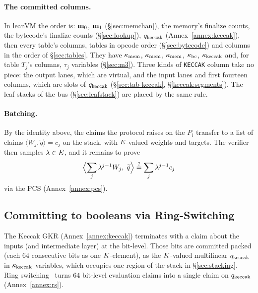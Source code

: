\paragraph{The committed columns.} In leanVM the order is: $\mathbf{m}_0$, $\mathbf{m}_1$ (\S\ref{sec:memchan}), the memory's finalize counts, the bytecode's finalize counts (\S\ref{sec:lookup}), $q_{\mathrm{keccak}}$ (Annex~\ref{annex:keccak}), then every table's columns, tables in opcode order (\S\ref{sec:bytecode}) and columns in the order of \S\ref{sec:tables}. They have $\kappa_{\mathrm{mem}}$, $\kappa_{\mathrm{mem}}$, $\kappa_{\mathrm{mem}}$, $\kappa_{\mathrm{bc}}$, $\kappa_{\mathrm{keccak}}$ and, for table $T_j$'s columns, $\tau_j$ variables (\S\ref{sec:m3}). Three kinds of \texttt{KECCAK} column take no piece: the output lanes, which are virtual, and the input lanes and first fourteen columns, which are slots of $q_{\mathrm{keccak}}$ (\S\ref{sec:tab-keccak}, \S\ref{keccak:segments}). The leaf stacks of the bus (\S\ref{sec:leafstack}) are placed by the same rule.

\paragraph{Batching.} By the identity above, the claims the protocol raises on the $P_i$ transfer to a list of claims $\langle W_j,\widetilde q\rangle=c_j$ on the stack, with $E$-valued weights and targets. The verifier then samples $\lambda\in E$, and it remains to prove
\[
  \Bigl\langle \sum_j\lambda^{j-1}W_j,\;\widetilde q\Bigr\rangle\stackrel{?}{=}\sum_j\lambda^{j-1}c_j
\]
via the PCS (Annex~\ref{annex:pcs}).

\subsection{Committing to booleans via Ring-Switching}\label{sec:ringswitch}

The Keccak GKR (Annex~\ref{annex:keccak}) terminates with a claim about the inputs (and intermediate layer) at the bit-level. Those bits are committed packed (each $64$ consecutive bits as one $K$-element), as the $K$-valued multilinear $q_{\mathrm{keccak}}$ in $\kappa_{\mathrm{keccak}}$ variables, which occupies one region of the stack in \S\ref{sec:stacking}. Ring switching~\cite{DP24} turns $64$ bit-level evaluation claims into a single claim on $q_{\mathrm{keccak}}$ (Annex~\ref{annex:rs}).
